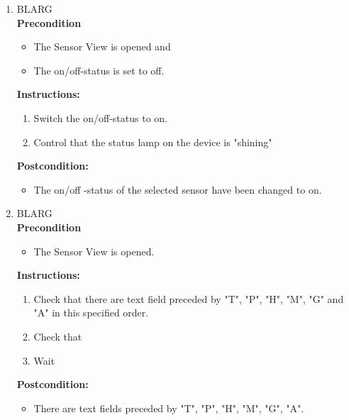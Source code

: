 \documentclass[a4paper]{article}
\newlength{\testlabellength}
\newenvironment{testlist}{\begin{enumerate}[label=\bfseries Instruction \thesubsection.\arabic* , labelindent=0pt, labelwidth=\testlabellength , leftmargin=2cm]}{\end{enumerate}}
\newenvironment{precondition}{
{\color{white}BLARG}\\ 
\textbf{Precondition}
\begin{itemize}[labelindent=0cm, labelwidth=2cm , leftmargin=1cm]
}
{\end{itemize}}
\newenvironment{instruction}{
\textbf{Instructions:}
\begin{enumerate}[label=\bfseries  \arabic*., labelindent=0cm, labelwidth=2cm , leftmargin=1cm]
}
{\end{enumerate}}
\newenvironment{postcondition}{
\textbf{Postcondition:}
\begin{itemize}[labelindent=0cm, labelwidth=2cm , leftmargin=1cm]
}
{\end{itemize}}
\begin{document}
\begin{appendices}
\begin{testlist}
	\item
		\begin{precondition}
			\item The Sensor View is opened and
			\item The on/off-status is set to off.
		\end{precondition}
		\begin{instruction}
			\item Switch the on/off-status to on.  
	  	    \item Control that the status lamp on the device is "shining"
	  	\end{instruction}
	  	\begin{postcondition}
	  		\item The on/off -status of the selected sensor have been changed to on.
	  	\end{postcondition}

	\item
		\begin{precondition}
			\item The Sensor View is opened. 
		\end{precondition}
		\begin{instruction}
			\item Check that there are text field preceded by "T", "P", "H", "M", "G" and "A" in this specified order.
			\item Check that
			\item Wait
		\end{instruction}
		\begin{postcondition}
			\item There are text fields preceded by "T", "P", "H", "M", "G", "A".
		\end{postcondition}


\end{testlist}
\end{appendices}
\end{document}
